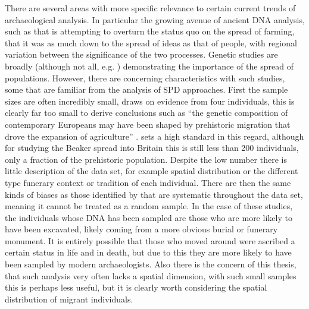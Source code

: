 There are several areas with more specific relevance to certain current trends of archaeological analysis. In particular the growing avenue of ancient DNA analysis, such as \citet{Skoglund466} that is attempting to overturn the status quo on the spread of farming, that it was as much down to the spread of ideas as that of people, with regional variation between the significance of the two processes. Genetic studies are broadly (although not all, e.g. \citealp{Haak1016}) demonstrating the importance of the spread of populations. However, there are concerning characteristics with such studies, some that are familiar from the analysis of SPD approaches. First the sample sizes are often incredibly small, \citet{Skoglund466} draws on evidence from four individuals, this is clearly far too small to derive conclusions such as ``the genetic composition of contemporary Europeans may have been shaped by prehistoric migration that drove the expansion of agriculture'' \citep[469]{Skoglund466}. \citet{Olalde:2018fk} sets a high standard in this regard, although for studying the Beaker spread into Britain this is still less than 200 individuals, only a fraction of the prehistoric population. Despite the low number there is little description of the data set, for example spatial distribution or the different type funerary context or tradition of each individual. There are then the same kinds of biases as those identified by \citet{Torfing2015193} that are systematic throughout the data set, meaning it cannot be treated as a random sample. In the case of these studies, the individuals whose DNA has been sampled are those who are more likely to have been excavated, likely coming from a more obvious burial or funerary monument. It is entirely possible that those who moved around were ascribed a certain status in life and in death, but due to this they are more likely to have been sampled by modern archaeologists. Also there is the concern of this thesis, that such analysis very often lacks a spatial dimension, with such small samples this is perhaps less useful, but it is clearly worth considering the spatial distribution of migrant individuals.


